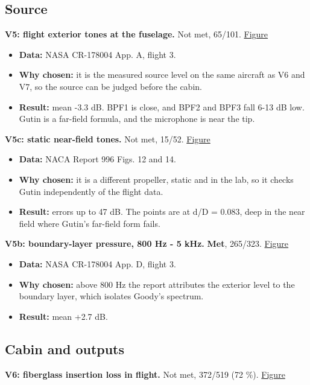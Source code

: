 \documentclass[10pt,a4paper]{article}
\begin{document}
\subsection*{Source}

\textbf{V5: flight exterior tones at the fuselage.} Not met, 65/101. \href{../figures/V5.png}{Figure}

\begin{itemize}
\item \textbf{Data:} NASA CR-178004 App. A, flight 3.
\item \textbf{Why chosen:} it is the measured source level on the same aircraft as V6 and V7, so the source can be judged before the cabin.
\item \textbf{Result:} mean -3.3 dB. BPF1 is close, and BPF2 and BPF3 fall 6-13 dB low. Gutin is a far-field formula, and the microphone is near the tip.
\end{itemize}

\textbf{V5c: static near-field tones.} Not met, 15/52. \href{../figures/V5c.png}{Figure}

\begin{itemize}
\item \textbf{Data:} NACA Report 996 Figs. 12 and 14.
\item \textbf{Why chosen:} it is a different propeller, static and in the lab, so it checks Gutin independently of the flight data.
\item \textbf{Result:} errors up to 47 dB. The points are at d/D = 0.083, deep in the near field where Gutin's far-field form fails.
\end{itemize}

\textbf{V5b: boundary-layer pressure, 800 Hz - 5 kHz.} \textbf{Met}, 265/323. \href{../figures/V5b.png}{Figure}

\begin{itemize}
\item \textbf{Data:} NASA CR-178004 App. D, flight 3.
\item \textbf{Why chosen:} above 800 Hz the report attributes the exterior level to the boundary layer, which isolates Goody's spectrum.
\item \textbf{Result:} mean +2.7 dB.
\end{itemize}

\subsection*{Cabin and outputs}

\textbf{V6: fiberglass insertion loss in flight.} Not met, 372/519 (72 \%). \href{../figures/V6.png}{Figure}
\end{document}
